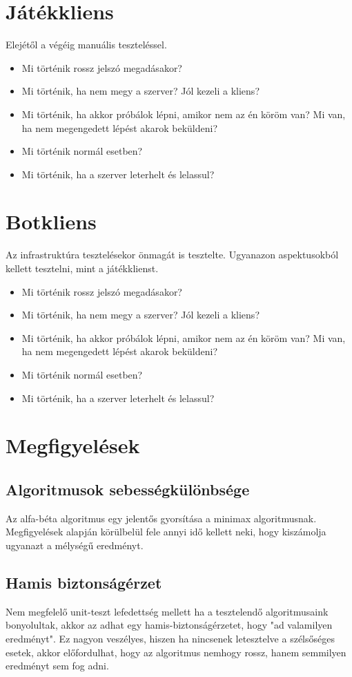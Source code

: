 \documentclass[twoside, a4paper, 12pt]{book}
\begin{document}
\section{Játékkliens}
Elejétől a végéig manuális teszteléssel.
\begin{itemize}
	\item Mi történik rossz jelszó megadásakor?
	\item Mi történik, ha nem megy a szerver? Jól kezeli a kliens?
	\item Mi történik, ha akkor próbálok lépni, amikor nem az én köröm van? Mi van, ha nem megengedett lépést akarok beküldeni?
	\item Mi történik normál esetben?
	\item Mi történik, ha a szerver leterhelt és lelassul?
\end{itemize}

\section{Botkliens}
Az infrastruktúra tesztelésekor önmagát is tesztelte. Ugyanazon aspektusokból kellett tesztelni, mint a játékklienst.
\begin{itemize}
	\item Mi történik rossz jelszó megadásakor?
	\item Mi történik, ha nem megy a szerver? Jól kezeli a kliens?
	\item Mi történik, ha akkor próbálok lépni, amikor nem az én köröm van? Mi van, ha nem megengedett lépést akarok beküldeni?
	\item Mi történik normál esetben?
	\item Mi történik, ha a szerver leterhelt és lelassul?
\end{itemize}

\section{Megfigyelések}
\subsection{Algoritmusok sebességkülönbsége}
Az alfa-béta algoritmus egy jelentős gyorsítása a minimax algoritmusnak. Megfigyelések alapján körülbelül fele annyi idő kellett neki, hogy kiszámolja ugyanazt a mélységű eredményt. 

\subsection{Hamis biztonságérzet}
Nem megfelelő unit-teszt lefedettség mellett ha a tesztelendő algoritmusaink bonyolultak, akkor az adhat egy hamis-biztonságérzetet, hogy "ad valamilyen eredményt". Ez nagyon veszélyes, hiszen ha nincsenek letesztelve a szélsőséges esetek, akkor előfordulhat, hogy az algoritmus nemhogy rossz, hanem semmilyen eredményt sem fog adni.
\end{document}
